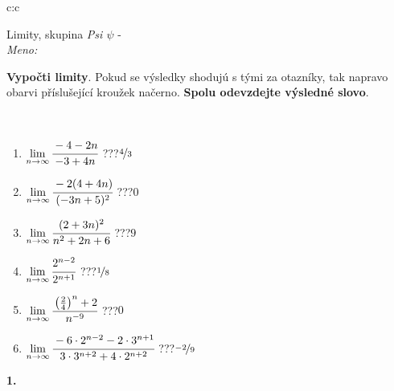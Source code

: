 \documentclass[10pt]{report}
\begin{document}
\begin{tabular}{c:c}
\begin{minipage}[c][104.5mm][t]{0.5\linewidth}
\begin{center}
\vspace{7mm}
{\huge Limity, skupina \textit{Psi $\psi$} -}\\[5mm]
\textit{Meno:}\phantom{xxxxxxxxxxxxxxxxxxxxxxxxxxxxxxxxxxxxxxxxxxxxxxxxxxxxxxxxxxxxxxxxx}\\[5mm]
\begin{minipage}{0.95\linewidth}
\begin{center}
\textbf{Vypočti limity}. Pokud se výsledky shodujú s tými za otazníky, tak napravo\\obarvi příslušející kroužek načerno. \textbf{Spolu odevzdejte výsledné slovo}.
\end{center}
\end{minipage}
\\[1mm]
\begin{minipage}{0.79\linewidth}
\begin{center}
\begin{varwidth}{\linewidth}
\begin{enumerate}
\normalsize
\item $\lim\limits_{n\to\infty}\cfrac{-4-2n}{-3+4n}$\quad \dotfill\; ???\;\dotfill \quad $\nicefrac{4}{3}$
\item $\lim\limits_{n\to\infty}\cfrac{-2(4+4n)}{(-3n+5)^2}$\quad \dotfill\; ???\;\dotfill \quad $0$
\item $\lim\limits_{n\to\infty}\cfrac{(2+3n)^2}{n^2+2n+6}$\quad \dotfill\; ???\;\dotfill \quad $9$
\item $\lim\limits_{n\to\infty}\cfrac{2^{n-2}}{2^{n+1}}$\quad \dotfill\; ???\;\dotfill \quad $\nicefrac{1}{8}$
\item $\lim\limits_{n\to\infty}\cfrac{\left(\frac{2}{4}\right)^n +2}{n^{-9}}$\quad \dotfill\; ???\;\dotfill \quad $0$
\item $\lim\limits_{n\to\infty}\cfrac{-6\cdot 2^{n-2}-2\cdot 3^{n+1}}{3\cdot 3^{n+2}+4\cdot 2^{n+2}}$\quad \dotfill\; ???\;\dotfill \quad $\nicefrac{-2}{9}$
\end{enumerate}
\end{varwidth}
\end{center}
\end{minipage}
\begin{minipage}{0.20\linewidth}
\begin{center}
{\Huge\bfseries 1.} \\[2mm]

\end{center}
\end{minipage}
\end{center}
\end{minipage}
\end{tabular}
\end{document}
